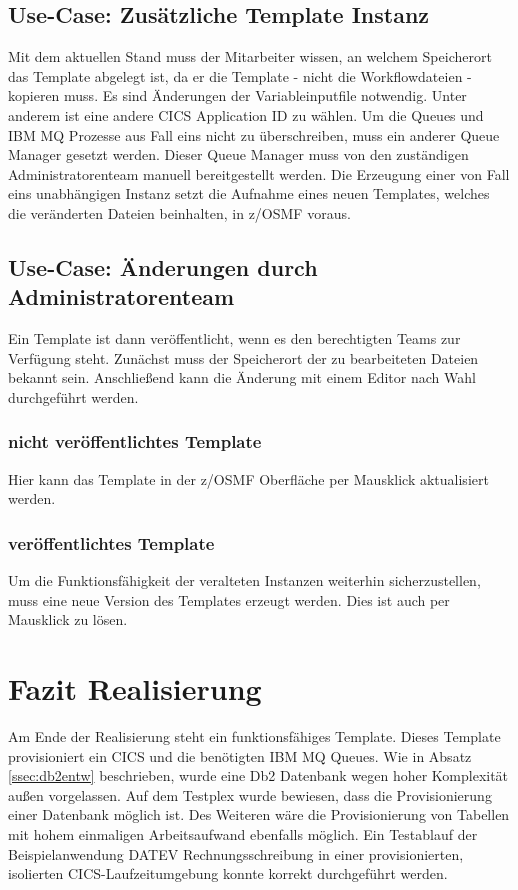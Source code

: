 \subsection{Use-Case: Zusätzliche Template Instanz}\label{ssec:akttemp2fall}
Mit dem aktuellen Stand muss der Mitarbeiter wissen, an welchem Speicherort das Template abgelegt ist, da er die Template - nicht die Workflowdateien - kopieren muss.
Es sind Änderungen der Variableinputfile notwendig.
Unter anderem ist eine andere CICS Application ID zu wählen.
Um die Queues und IBM MQ Prozesse aus Fall eins nicht zu überschreiben, muss  ein anderer Queue Manager gesetzt werden.
Dieser Queue Manager muss von den zuständigen Administratorenteam manuell bereitgestellt werden.
Die Erzeugung einer von Fall eins unabhängigen Instanz setzt die Aufnahme eines neuen Templates, welches die veränderten Dateien beinhalten, in z/OSMF voraus.

\subsection{Use-Case: Änderungen durch Administratorenteam}
Ein Template ist dann veröffentlicht, wenn es den berechtigten Teams zur Verfügung steht.
Zunächst muss der Speicherort der zu bearbeiteten Dateien bekannt sein.
Anschließend kann die Änderung mit einem Editor nach Wahl durchgeführt werden.

\subsubsection{nicht veröffentlichtes Template}
Hier kann das Template in der z/OSMF Oberfläche per Mausklick aktualisiert werden.

\subsubsection{veröffentlichtes Template}
Um die Funktionsfähigkeit der veralteten Instanzen weiterhin sicherzustellen, muss eine neue Version des Templates erzeugt werden.
Dies ist auch per Mausklick zu lösen.

\section{Fazit Realisierung}
Am Ende der Realisierung steht ein funktionsfähiges Template.
Dieses Template provisioniert ein CICS und die benötigten IBM MQ Queues.
Wie in Absatz \ref{ssec:db2entw} beschrieben, wurde eine Db2 Datenbank wegen hoher Komplexität außen vorgelassen.
Auf dem Testplex wurde bewiesen, dass die Provisionierung einer Datenbank möglich ist.
Des Weiteren wäre die Provisionierung von Tabellen mit hohem einmaligen Arbeitsaufwand ebenfalls möglich.
Ein Testablauf der Beispielanwendung DATEV Rechnungsschreibung in einer provisionierten, isolierten CICS-Laufzeitumgebung konnte korrekt durchgeführt werden.

